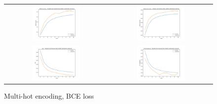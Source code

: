 \begin{appendices}
        \begin{figure}[H]
            \centering
            \begin{tabular}{cc}
                \includegraphics[width=0.48\textwidth]{figures/training_plots/ModelB-(1D)-MultiHot-BCE-ADAM_12-04-2019_19-00-30_AON-accuracy.pdf} & \includegraphics[width=0.48\textwidth]{figures/training_plots/ModelB-(1D)-MultiHot-BCE-ADAM_12-04-2019_19-00-30_binary-accuracy.pdf} \\
                \includegraphics[width=0.48\textwidth]{figures/training_plots/ModelB-(1D)-MultiHot-BCE-ADAM_12-04-2019_19-00-30_loss.pdf} & \includegraphics[width=0.48\textwidth]{figures/training_plots/ModelB-(1D)-MultiHot-BCE-ADAM_12-04-2019_19-00-30_KL-divergence.pdf}
            \end{tabular}
            \caption*{Multi-hot encoding, BCE loss}
        \end{figure}
        

\end{appendices}
